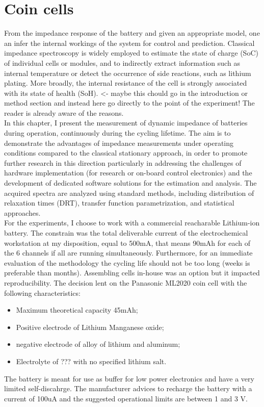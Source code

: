 \chapter{Coin cells}

From the impedance response of the battery and given an appropriate model, one an infer the internal workings of the system for control and prediction. Classical impedance spectroscopy is widely employed to estimate the state of charge (SoC) of individual cells or modules, and to indirectly extract information such as internal temperature or detect the occurrence of side reactions, such as lithium plating. More broadly, the internal resistance of the cell is strongly associated with its state of health (SoH). <- maybe this chould go in the introduction or method section and instead here go directly to the point of the experiment! The reader is already aware of the reasons.\\

In this chapter, I present the measurement of dynamic impedance of batteries during operation, continuously during the cycling lifetime. The aim is to demonstrate the advantages of impedance measurements under operating conditions compared to the classical stationary approach, in order to promote further research in this direction particularly in addressing the challenges of hardware implementation (for research or on-board control electronics) and the development of dedicated software solutions for the estimation and analysis. The acquired spectra are analyzed using standard methods, including distribution of relaxation times (DRT), transfer function parametrization, and statistical approaches.\\

For the experiments, I choose to work with a commercial reacharable Lithium-ion battery. The constrain was the total deliverable current of the electrochemical workstation at my disposition, equal to 500mA, that means 90mAh for each of the 6 channels if all are running simultaneously. Furthermore, for an immediate evaluation of the methodology the cycling life should not be too long (weeks is preferable than months). Assembling cells in-house was an option but it impacted reproducibility. The decision lent on the Panasonic ML2020 coin cell with the following characteristics:
\begin{itemize}
    \item Maximum theoretical capacity 45mAh;
    \item Positive electrode of Lithium Manganese oxide;
    \item negative electrode of alloy of lithium and aluminum;
    \item Electrolyte of ??? with no specified lithium salt.
\end{itemize}
The battery is meant for use as buffer for low power electronics and have a very limited self-discahrge. The manufacturer advices to recharge the battery with a current of 100uA and the suggested operational limits are between 1 and 3 V.\\

